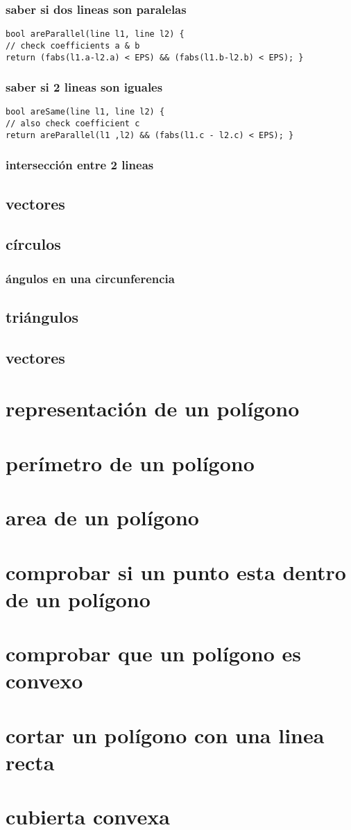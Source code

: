 \subsubsection{saber si dos lineas son paralelas}
\begin{lstlisting}[style=C]
bool areParallel(line l1, line l2) {
// check coefficients a & b
return (fabs(l1.a-l2.a) < EPS) && (fabs(l1.b-l2.b) < EPS); }
\end{lstlisting}
\subsubsection{saber si 2 lineas son iguales}
\begin{lstlisting}[style=C]
bool areSame(line l1, line l2) {
// also check coefficient c
return areParallel(l1 ,l2) && (fabs(l1.c - l2.c) < EPS); }
\end{lstlisting}
\subsubsection{intersección entre 2 lineas}
\subsection{vectores}
\subsection{círculos}
\subsubsection{ángulos en una circunferencia}
\subsection{triángulos}
\subsection{vectores}
\section{representación de un polígono}
\section{perímetro de un polígono}
\section{area de un polígono}
\section{comprobar si un punto esta dentro de un polígono}
\section{comprobar que un polígono es convexo}
\section{cortar un polígono con una linea recta}
\section{cubierta convexa}